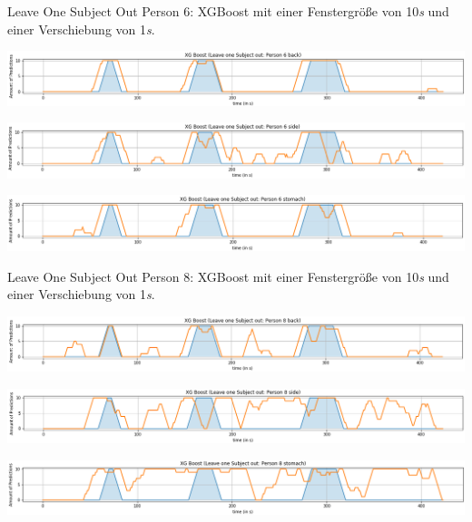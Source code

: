\documentclass[18pt]{beamer}
\begin{document}
\begin{frame} {Leave One Subject Out}
    Person 6: XGBoost mit einer Fenstergröße von 10\textit{s} und einer Verschiebung von 1\textit{s}.
    \begin{center}
        \includegraphics[scale=0.29]{images/evaluation/loso_10sec/xg_boost_loso/XGBoost(LeaveOneSubjectOutPerson6Back).png}
    \end{center}
    \begin{center}
        \includegraphics[scale=0.29]{images/evaluation/loso_10sec/xg_boost_loso/XGBoost(LeaveOneSubjectOutPerson6Side).png}
    \end{center}
    \begin{center}
        \includegraphics[scale=0.29]{images/evaluation/loso_10sec/xg_boost_loso/XGBoost(LeaveOneSubjectOutPerson6Stomach).png}
    \end{center}
\end{frame}

\begin{frame} {Leave One Subject Out}
    Person 8: XGBoost mit einer Fenstergröße von 10\textit{s} und einer Verschiebung von 1\textit{s}.
    \begin{center}
        \includegraphics[scale=0.29]{images/evaluation/loso_10sec/xg_boost_loso/XGBoost(LeaveOneSubjectOutPerson8Back).png}
    \end{center}
    \begin{center}
        \includegraphics[scale=0.29]{images/evaluation/loso_10sec/xg_boost_loso/XGBoost(LeaveOneSubjectOutPerson8Side).png}
    \end{center}
    \begin{center}
        \includegraphics[scale=0.29]{images/evaluation/loso_10sec/xg_boost_loso/XGBoost(LeaveOneSubjectOutPerson8Stomach).png}
    \end{center}
\end{frame}
\end{document}
